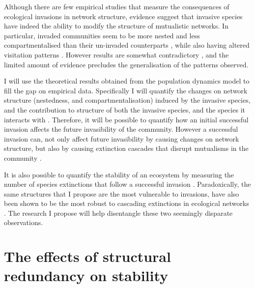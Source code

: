 \documentclass[a4paper]{article}
\begin{document}
Although there are few empirical studies that measure the consequences of ecological invasions in network structure, evidence suggest that invasive species have indeed the ability to modify the structure of mutualistic networks.
In particular, invaded communities seem to be more nested \autocite{Bartomeus2008, Stouffer2014} and less compartmentalised \autocite{Albrecht2014} than their un-invaded counterparts , while also having altered visitation patterns \autocite{Vila2009}.
However results are somewhat contradictory \autocite{Gilberto2012}, and the limited amount of evidence precludes the generalisation of the patterns observed.

I will use the theoretical results obtained from the population dynamics model to fill the gap on empirical data.
Specifically I will quantify the changes on network structure (nestedness, and compartmentalisation) induced by the invasive species, and the contribution to structure of both the invasive species, and the species it interacts with \autocite{Saavedra2011, Stouffer2014}.
Therefore, it will be possible to quantify how an initial successful invasion affects the future invasibility of the community.
However a successful invasion can, not only affect future invasibility by causing changes on network structure, but also by causing extinction cascades that disrupt mutualisms in the community \autocite{Christian2001, RodriguezCabal2013}.

It is also possible to quantify the stability of an ecosystem by measuring the number of species extinctions that follow a successful invasion \autocite{Post1983, Ives2007}.
Paradoxically, the same structures that I propose are the most vulnerable to invasions, have also been shown to be the most robust to cascading extinctions in ecological networks \autocite{Tylianakis2010, Stouffer2011, Albrecht2014}.
The research I propose will help disentangle these two seemingly disparate observations.









\section{The effects of structural redundancy on stability}

\end{document}
